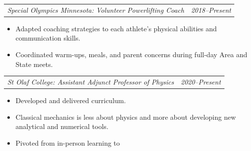 \documentclass[12pt,letterpaper]{article}
\makeatletter
\newcommand{\headerpair}[2]{
    \begin{tabular*}{\linewidth}{l@{ \extracolsep{\fill} }r} {\large\emph{#1}} & {\large\emph{#2}}
    \end{tabular*}
}
\newcommand{\headerrow}[3]{\headerpair{#2: #1}{#3}}
\newcommand{\CPP}{C\nolinebreak[4]\hspace{-.05em}\raisebox{.22ex}{\footnotesize\bf ++}\xspace}
\makeatother
\begin{document}
\begin{itemize}

\end{itemize}


\headerrow
    {Volunteer Powerlifting Coach}
    {Special Olympics Minnesota}
    {2018--Present}
\begin{itemize}
    \item Adapted coaching strategies to each athlete's physical abilities and communication skills.
    \item Coordinated warm-ups, meals, and parent concerns during full-day Area and State meets.
\end{itemize}


\headerrow
    {Assistant Adjunct Professor of Physics}
    {St Olaf College}
    {2020--Present}
\begin{itemize}
    \item Developed and delivered curriculum.
    \item Classical mechanics is less about physics and more about developing new analytical and numerical tools.
    \item Pivoted from in-person learning to
\end{itemize}
\end{document}
